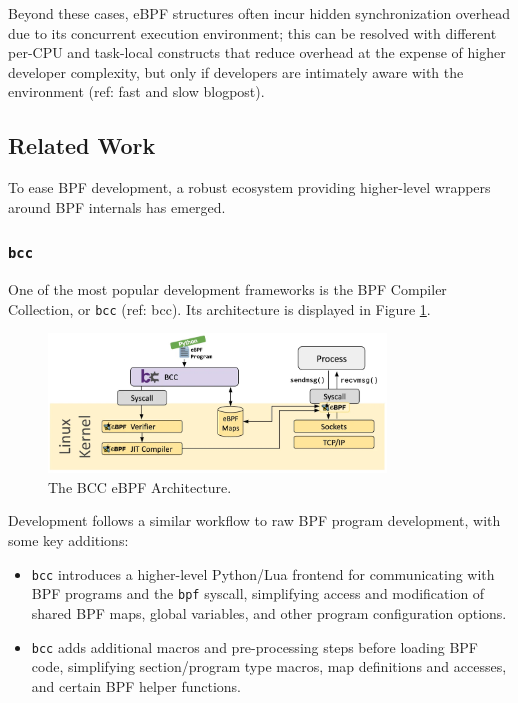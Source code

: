 Beyond these cases, eBPF structures often incur hidden synchronization overhead due to its
concurrent execution environment; this can be resolved with different per-CPU and task-local
constructs that reduce overhead at the expense of higher developer complexity, but only if
developers are intimately aware with the environment (ref: fast and slow blogpost).

\subsection{Related Work}

To ease BPF development, a robust ecosystem providing higher-level wrappers around BPF internals has
emerged.

\subsubsection{\texttt{bcc}}

One of the most popular development frameworks is the BPF Compiler Collection, or \texttt{bcc} (ref:
bcc). Its architecture is displayed in Figure \ref{fig:bcc-architecture}.

\begin{figure}[htpb]
    \centering
    \includegraphics[width=0.8\textwidth]{diagrams/bcc-architecture.png}
    \caption{The BCC eBPF Architecture.}
    \label{fig:bcc-architecture}
\end{figure}

Development follows a similar workflow to raw BPF program development, with some key additions:
\begin{itemize}
    \item \texttt{bcc} introduces a higher-level Python/Lua frontend for communicating with BPF
        programs and the \texttt{bpf} syscall, simplifying access and modification of shared BPF
        maps, global variables, and other program configuration options.
    \item \texttt{bcc} adds additional macros and pre-processing steps before loading BPF code,
        simplifying section/program type macros, map definitions and accesses, and certain BPF
        helper functions.
\end{itemize}

